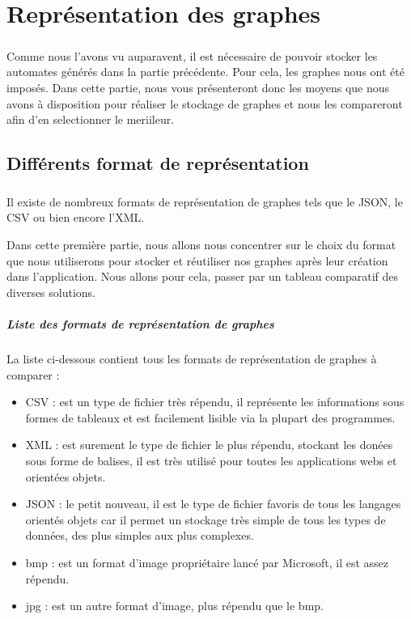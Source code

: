 \chapter{Représentation des graphes}
\paragraph{}
Comme nous l'avons vu auparavent, il est nécessaire de pouvoir stocker les automates générés dans la partie précédente. Pour cela, les graphes nous ont été imposés. Dans cette partie, nous vous présenteront donc les moyens que nous avons à disposition pour réaliser le stockage de graphes et nous les compareront afin d'en selectionner le meriileur.

\section{Différents format de représentation}
  \paragraph{}
  Il existe de nombreux formats de représentation de graphes tels que le JSON, le CSV ou bien encore l'XML.
  
  Dans cette première partie, nous allons nous concentrer sur le choix du format que nous utiliserons pour stocker et réutiliser nos graphes après leur création dans l'application.
  Nous allons pour cela, passer par un tableau comparatif des diverses solutions.
  

  \paragraph{Liste des formats de représentation de graphes}
  La liste ci-dessous contient tous les formats de représentation de graphes à comparer : 
  \begin{itemize}
   \item CSV : est un type de fichier très répendu, il représente les informations sous formes de tableaux et est facilement lisible via la plupart des programmes. 
   \item XML : est surement le type de fichier le plus répendu, stockant les donées sous forme de balises, il est très utilisé pour toutes les applications webs et orientées objets. 
   \item JSON : le petit nouveau, il est le type de fichier favoris de tous les langages orientés objets car il permet un stockage très simple de tous les types de données, des plus simples aux plus complexes. 
   \item bmp : est un format d'image propriétaire lancé par Microsoft, il est assez répendu.
   \item jpg : est un autre format d'image, plus répendu que le bmp.
  \end{itemize}

